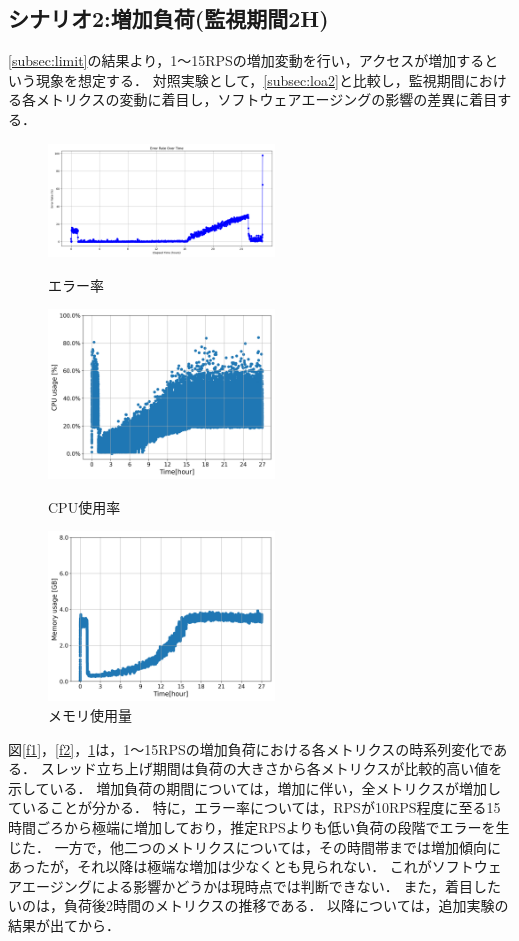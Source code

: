 \documentclass[twoside,twocolumn,10pt]{jarticle}  %
\begin{document}
\subsection{シナリオ2:増加負荷(監視期間2H)}\label{subsec:load2} 
\ref{subsec:limit}の結果より，1～15RPSの増加変動を行い，アクセスが増加するという現象を想定する．
対照実験として，\ref{subsec:loa2}と比較し，監視期間における各メトリクスの変動に着目し，ソフトウェアエージングの影響の差異に着目する．
\begin{figure}[H]
  \centering
  \includegraphics[scale=0.1,width=60mm]{figures/8core_1_15rps_error_rate.png}
  \caption{エラー率}
  \label{f1}

  \centering
  \includegraphics[scale=0.1,width=60mm]{figures/8core_1_15rps_increase_cpu.png}
  \caption{CPU使用率}
  \label{f2}

  \centering
  \includegraphics[scale=0.1,width=60mm]{figures/8core_1_15rps_increase_mem.png}
  \caption{メモリ使用量}
  \label{f3}
\end{figure}

図\ref{f1}，\ref{f2}，\ref{f3}は，1～15RPSの増加負荷における各メトリクスの時系列変化である．
スレッド立ち上げ期間は負荷の大きさから各メトリクスが比較的高い値を示している．
増加負荷の期間については，増加に伴い，全メトリクスが増加していることが分かる．
特に，エラー率については，RPSが10RPS程度に至る15時間ごろから極端に増加しており，推定RPSよりも低い負荷の段階でエラーを生じた．
一方で，他二つのメトリクスについては，その時間帯までは増加傾向にあったが，それ以降は極端な増加は少なくとも見られない．
これがソフトウェアエージングによる影響かどうかは現時点では判断できない．
また，着目したいのは，負荷後2時間のメトリクスの推移である．
以降については，追加実験の結果が出てから．
\end{document}
